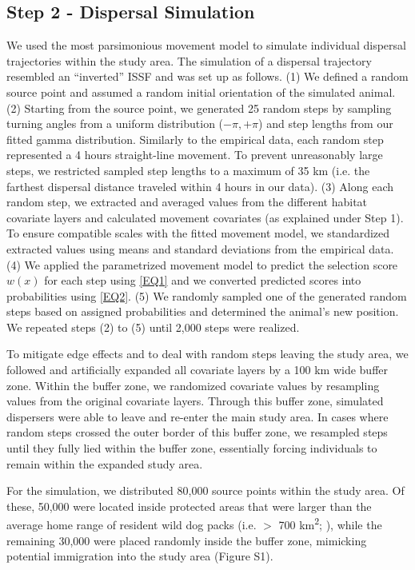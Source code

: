 \documentclass[abstract=on,10pt,a4paper,bibliography=totocnumbered]{article}
\begin{document}
\subsection{Step 2 - Dispersal Simulation}
We used the most parsimonious movement model to simulate individual dispersal
trajectories within the study area. The simulation of a dispersal trajectory
resembled an ``inverted'' ISSF and was set up as follows. (1) We defined a
random source point and assumed a random initial orientation of the simulated
animal. (2) Starting from the source point, we generated 25 random steps by
sampling turning angles from a uniform distribution (\(-\pi, +\pi\)) and step
lengths from our fitted gamma distribution. Similarly to the empirical data,
each random step represented a 4 hours straight-line movement. To prevent
unreasonably large steps, we restricted sampled step lengths to a maximum of 35
km (i.e. the farthest dispersal distance traveled within 4 hours in our data).
(3) Along each random step, we extracted and averaged values from the different
habitat covariate layers and calculated movement covariates (as explained under
Step 1). To ensure compatible scales with the fitted movement model, we
standardized extracted values using means and standard deviations from the
empirical data. (4) We applied the parametrized movement model to predict the
selection score \(w(x)\) for each step using \ref{EQ1} and we converted
predicted scores into probabilities using \ref{EQ2}. (5) We randomly sampled one
of the generated random steps based on assigned probabilities and determined the
animal's new position. We repeated steps (2) to (5) until 2,000 steps were
realized.

To mitigate edge effects and to deal with random steps leaving the study area,
we followed \cite{Koen.2010} and artificially expanded all covariate layers by a
100 km wide buffer zone. Within the buffer zone, we randomized covariate values
by resampling values from the original covariate layers. Through this buffer
zone, simulated dispersers were able to leave and re-enter the main study area.
In cases where random steps crossed the outer border of this buffer zone, we
resampled steps until they fully lied within the buffer zone, essentially
forcing individuals to remain within the expanded study area.

For the simulation, we distributed 80,000 source points within the study area.
Of these, 50,000 were located inside protected areas that were larger than the
average home range of resident wild dog packs (i.e. \(>\) 700
km\textsuperscript{2}; \citealp{Pomilia.2015}), while the remaining 30,000 were
placed randomly inside the buffer zone, mimicking potential immigration into the
study area (Figure S1).
\end{document}
